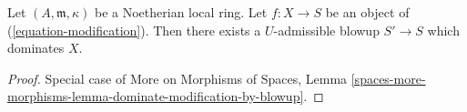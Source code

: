 \begin{lemma}
\label{lemma-dominate-by-admissible-blowup}
Let $(A, \mathfrak m, \kappa)$ be a Noetherian local ring.
Let $f : X \to S$ be an object of (\ref{equation-modification}).
Then there exists a $U$-admissible blowup $S' \to S$
which dominates $X$.
\end{lemma}

\begin{proof}
Special case of More on Morphisms of Spaces,
Lemma \ref{spaces-more-morphisms-lemma-dominate-modification-by-blowup}.
\end{proof}











